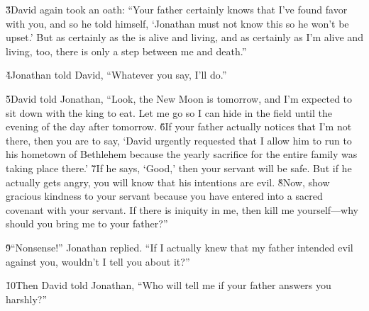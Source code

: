 \v{3}David again took an oath: ``Your father certainly knows that I've found favor with you, and so he told himself, `Jonathan must not know this so he won't be upset.' But as certainly as the  is alive and living, and as certainly as I'm alive and living, too, there is only a step between me and death.''

\v{4}Jonathan told David, ``Whatever you say, I'll do.''

\v{5}David told Jonathan, ``Look, the New Moon is tomorrow, and I'm expected to sit down with the king to eat. Let me go so I can hide in the field until the evening of the day after tomorrow. \v{6}If your father actually notices that I'm not there, then you are to say, `David urgently requested that I allow him to run to his hometown of Bethlehem because the yearly sacrifice for the entire family was taking place there.' \v{7}If he says, `Good,' then your servant will be safe. But if he actually gets angry, you will know that his intentions are evil. \v{8}Now, show gracious kindness to your servant because you have entered into a sacred covenant with your servant. If there is iniquity in me, then kill me yourself---why should you bring me to your father?''

\v{9}``Nonsense!'' Jonathan replied. ``If I actually knew that my father intended evil against you, wouldn't I tell you about it?''

\v{10}Then David told Jonathan, ``Who will tell me if your father answers you harshly?''

